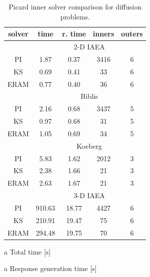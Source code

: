 \begin{table}[ht] 

 \begin{center} 
  \caption{Picard inner solver comparison for diffusion problems.} 
 \label{tbl:diffusion_picard_inner_study} 
 \begin{threeparttable}
 \begin{tabular}{ccccc} 
 \toprule 
  solver & time \tnote{a} & r. time \tnote{b} & inners & outers \\
 \midrule 
              &  \multicolumn{4}{c}{2-D IAEA} \\ 
 \midrule 
           PI &      1.87 &      0.37 &         3416 &            6 \\ 
           KS &      0.69 &      0.41 &           33 &            6 \\ 
         ERAM &      0.77 &      0.40 &           36 &            6 \\ 
 \midrule 
              &  \multicolumn{4}{c}{Biblis} \\ 
 \midrule 
           PI &      2.16 &      0.68 &         3437 &            5 \\ 
           KS &      0.97 &      0.68 &           31 &            5 \\ 
         ERAM &      1.05 &      0.69 &           34 &            5 \\ 
 \midrule 
              &  \multicolumn{4}{c}{Koeberg} \\ 
 \midrule 
           PI &      5.83 &      1.62 &         2012 &            3 \\ 
           KS &      2.38 &      1.66 &           21 &            3 \\ 
         ERAM &      2.63 &      1.67 &           21 &            3 \\ 
 \midrule 
              &  \multicolumn{4}{c}{3-D IAEA} \\ 
 \midrule 
           PI &    910.63 &     18.77 &         4427 &            6 \\ 
           KS &    210.91 &     19.47 &           75 &            6 \\ 
         ERAM &    294.48 &     19.75 &           70 &            6 \\ 
 \bottomrule 
 \end{tabular} 
 

 {\footnotesize
 \begin{tablenotes}
   \item[a] Total time [s]
   \item[a] Response generation time [s]
 \end{tablenotes}
 }
 \end{threeparttable}
 
 
 
 \end{center} 

\end{table} 


